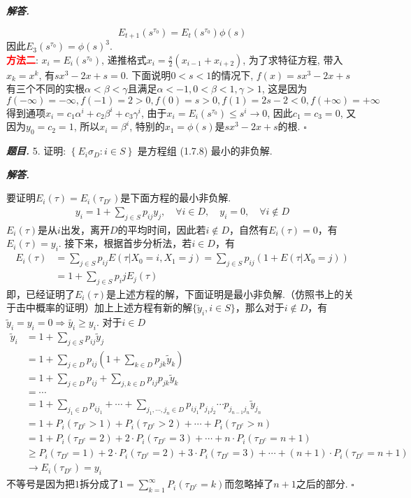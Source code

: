 \documentclass[10pt, a4paper, oneside]{ctexart}
\newenvironment{problem}{\begin{framed}\par\noindent\textbf{\textit{题目. }}}{\end{framed}\par}
\newenvironment{solution}{%
  \par\noindent\textbf{\textit{解答. }}\ignorespaces
}{%
  \hfill\ensuremath{\square}\par %
}
\begin{document}
\begin{solution}
    $$E_{t+1}(s^{\tau_0})=E_t(s^{\tau_0})\phi(s)$$
    因此$E_{3}(s^{\tau_0})=\phi(s)^3$.\\
    \textcolor{red}{\textbf{方法二}}: $x_i=E_i(s^{\tau_0})$, 递推格式$x_i=\frac{s}{2}(x_{i-1}+x_{i+2})$, 为了求特征方程, 带入$x_k=x^k$, 有$sx^3-2x+s=0$. 下面说明$0<s<1$的情况下, $f(x)=sx^3-2x+s$有三个不同的实根$\alpha<\beta<\gamma$且满足$\alpha<-1,0<\beta<1,\gamma>1$, 这是因为 
    $$f(-\infty)=-\infty,f(-1)=2>0,f(0)=s>0,f(1)=2s-2<0,f(+\infty)=+\infty$$
    得到通项$x_i=c_1\alpha^i+c_2\beta^i+c_3\gamma^i$, 由于$x_i=E_i(s^{\tau_0})\leq s^i\to 0$, 因此$c_1=c_3=0$, 又因为$y_0=c_2=1$, 所以$x_i=\beta^i$, 特别的$x_1=\phi(s)$是$sx^3-2x+s$的根.
\end{solution}

\begin{problem}
    5. 证明: \( \left\{  {{E}_{i}{\sigma }_{D} : i \in  S}\right\}   \) 是方程组 (1.7.8) 最小的非负解.
\end{problem}

\begin{solution}
    要证明$E_i(\tau)=E_i(\tau_{D^c})$是下面方程的最小非负解.
    \begin{align*}
        y_i=1+\sum_{j\in S}p_{ij}y_j,\quad \forall i\in D,\quad y_i=0,\quad \forall i\notin D
    \end{align*}
    $E_i(\tau)$是从$i$出发，离开$D$的平均时间，因此若$i\notin D$，自然有$E_i(\tau)=0$，有$E_i(\tau)=y_i$. 接下来，根据首步分析法，若$i\in D$，有
    \begin{align*}
        E_i(\tau)&=\sum_{j\in S}p_{ij}E(\tau|X_0=i,X_1=j)=\sum_{j\in S}p_{ij}(1+E(\tau|X_0=j))\\&=1+\sum_{j\in S}p_ijE_j(\tau)
    \end{align*}
    即，已经证明了$E_i(\tau)$是上述方程的解，下面证明是最小非负解.（仿照书上的关于击中概率的证明）加上上述方程有新的解$\{\tilde{y}_i,i\in S\}$，那么对于$i\notin D$，有$\tilde{y}_i=y_i=0\Rightarrow \tilde{y_i}\geq y_i$. 对于$i\in D$
    \begin{align*}
        \tilde{y}_i&=1+\sum_{j\in S}p_{ij} \tilde{y}_j\\
        &=1+\sum_{j\in D}p_{ij}(1+\sum_{k\in D}p_{jk} \tilde{y}_k)\\
        &=1+\sum_{j\in D}p_{ij}+\sum_{j,k\in D}p_{ij}p_{jk} \tilde{y}_k\\
        &=\cdots\\
        &=1+\sum_{j_1\in D}p_{ij_1}+\cdots+\sum_{j_1,\cdots,j_n\in D}p_{ij_1}p_{j_1j_2}\cdots p_{j_{n-1}j_n} \tilde{y}_{j_n}\\
        &=1+P_i(\tau_{D^c}>1)+P_i(\tau_{D^c}>2)+\cdots+P_i(\tau_{D^c}>n)\\
        &=1+P_i(\tau_{D^c}=2)+2\cdot P_i(\tau_{D^c}=3)+\cdots+n\cdot P_i(\tau_{D^c}=n+1)\\
        &\geq P_i(\tau_{D^c}=1)+2\cdot P_i(\tau_{D^c}=2)+3\cdot P_i(\tau_{D^c}=3)+\cdots+(n+1)\cdot P_i(\tau_{D^c}=n+1)\\
        &\to E_i(\tau_{D^c})=y_i
    \end{align*}
    不等号是因为把$1$拆分成了$1=\sum_{k=1}^{\infty}P_i(\tau_{D^c}=k)$而忽略掉了$n+1$之后的部分.
\end{solution}
\end{document}
